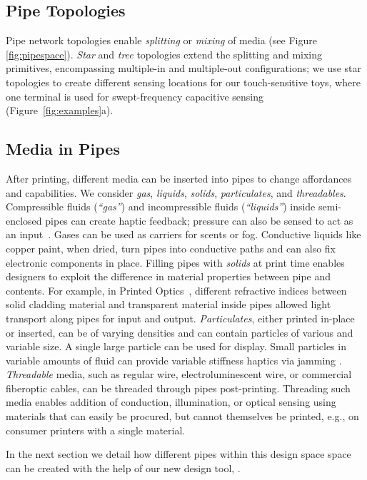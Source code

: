 \subsection{Pipe Topologies}
Pipe network topologies enable \emph{splitting} or \emph{mixing} of media (see Figure \ref{fig:pipespace}).  \emph{Star} and \emph{tree} topologies extend the splitting and mixing primitives, encompassing multiple-in and multiple-out configurations; we use star topologies to create different sensing locations for our touch-sensitive toys, where one terminal is used for swept-frequency capacitive sensing (Figure~\ref{fig:examples}a).

\subsection{Media in Pipes}
After printing, different media can be inserted into pipes to change affordances and capabilities. We consider \emph{gas}, \emph{liquids}, \emph{solids}, \emph{particulates}, and \emph{threadables}. 
%
Compressible fluids (\emph{``gas''}) and incompressible fluids (\emph{``liquids''})  inside semi-enclosed pipes can create haptic feedback; pressure can also be sensed to act as an input~\cite{Slyper-shape}. Gases can be used as carriers for scents or fog. Conductive liquids like copper paint, when dried, turn pipes into conductive paths and can also fix electronic components in place.
%
Filling pipes with \emph{solids} at print time enables designers to exploit the difference in material properties between pipe and contents. For example, in Printed Optics~\cite{Willis-printedoptics}, different refractive indices between solid cladding material and transparent material inside pipes allowed light transport along pipes for input and output.
%
\emph{Particulates}, either printed in-place or inserted, can be of varying densities and can contain particles of various and variable size.  A single large particle can be used for display.  Small particles in variable amounts of fluid can provide variable stiffness haptics via jamming \cite{Follmer-jamming}.
%
\emph{Threadable} media, such as regular wire, electroluminescent wire, or commercial fiberoptic cables, can be threaded through pipes post-printing. Threading such media enables addition of conduction, illumination, or optical sensing using materials that can easily be procured, but cannot themselves be printed, e.g., on consumer printers with a single material. 

In the next section we detail how different pipes within this design space space can be created with the help of our new design tool, \systemnamenospace.
